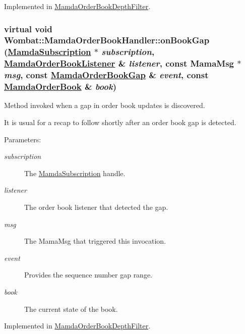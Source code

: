 Implemented in \hyperlink{classMamdaOrderBookDepthFilter_70d8025a3e8ce565c80dfeb5c6dc66eb}{Mamda\-Order\-Book\-Depth\-Filter}.\hypertarget{classWombat_1_1MamdaOrderBookHandler_54d949ce0ddfe085be5c6112a5682cec}{
\subsubsection[onBookGap]{\setlength{\rightskip}{0pt plus 5cm}virtual void Wombat::Mamda\-Order\-Book\-Handler::on\-Book\-Gap (\hyperlink{classWombat_1_1MamdaSubscription}{Mamda\-Subscription} $\ast$ {\em subscription}, \hyperlink{classWombat_1_1MamdaOrderBookListener}{Mamda\-Order\-Book\-Listener} \& {\em listener}, const Mama\-Msg $\ast$ {\em msg}, const \hyperlink{classWombat_1_1MamdaOrderBookGap}{Mamda\-Order\-Book\-Gap} \& {\em event}, const \hyperlink{classWombat_1_1MamdaOrderBook}{Mamda\-Order\-Book} \& {\em book})}}
\label{classWombat_1_1MamdaOrderBookHandler_54d949ce0ddfe085be5c6112a5682cec}


Method invoked when a gap in order book updates is discovered. 

It is usual for a recap to follow shortly after an order book gap is detected.

\begin{Desc}
\item[Parameters:]
\begin{description}
\item[{\em subscription}]The \hyperlink{classWombat_1_1MamdaSubscription}{Mamda\-Subscription} handle. \item[{\em listener}]The order book listener that detected the gap. \item[{\em msg}]The Mama\-Msg that triggered this invocation. \item[{\em event}]Provides the sequence number gap range. \item[{\em book}]The current state of the book. \end{description}
\end{Desc}


Implemented in \hyperlink{classMamdaOrderBookDepthFilter_ae2a8192b2034af1d1b3d6ef71521e8a}{Mamda\-Order\-Book\-Depth\-Filter}.
